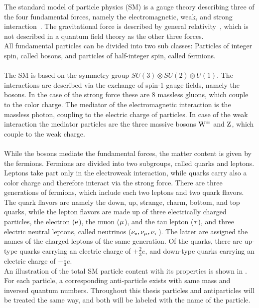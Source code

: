 The standard model of particle physics (SM) is a gauge theory describing three of the four fundamental forces, namely the electromagnetic, weak, and strong interaction~\cite{SM}. The gravitational force is described by general relativity~\cite{Einstein}, which is not described in a quantum field theory as the other three forces.\\
All fundamental particles can be divided into two sub classes: Particles of integer spin, called bosons, and particles of half-integer spin, called fermions.\\\\
The SM is based on the symmetry group $SU(3)\otimes SU(2)\otimes U(1)$. The interactions are described via the exchange of spin-1 gauge fields, namely the bosons. In the case of the strong force these are 8 massless gluons, which couple to the color charge. The mediator of the electromagnetic interaction is the massless photon, coupling to the electric charge of particles. In case of the weak interaction the mediator particles are the three massive bosons $\mathrm{W}^\pm$ and $\mathrm{Z}$, which couple to the weak charge.\\\\
While the bosons mediate the fundamental forces, the matter content is given by the fermions. Fermions are divided into two subgroups, called quarks and leptons. Leptons take part only in the electroweak interaction, while quarks carry also a color charge and therefore interact via the strong force. There are three generations of fermions, which include each two leptons and two quark flavors. The quark flavors are namely the down, up, strange, charm, bottom, and top quarks, while the lepton flavors are made up of three electrically charged particles, the electron ($\mathrm{e}$), the muon ($\mu$), and the tau lepton ($\tau$), and three electric neutral leptons, called neutrinos ($\nu_\mathrm{{e}},\nu_{\mu},\nu_{\tau}$). The latter are assigned the names of the charged leptons of the same generation. Of the quarks, there are up-type quarks carrying an electric charge of $+\frac{2}{3}e$, and down-type quarks carrying an electric charge of $-\frac{1}{3}e$.\\
An illustration of the total SM particle content with its properties is shown in .
For each particle, a corresponding anti-particle exists with same mass and inversed quantum numbers. Throughout this thesis particles and antiparticles will be treated the same way, and both will be labeled with the name of the particle.\\


